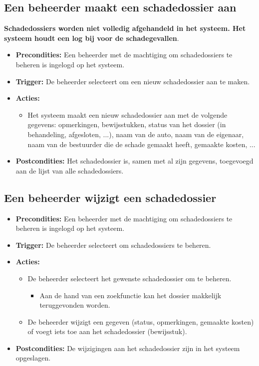 \documentclass[]{article}
\begin{document}
\subsection{Een beheerder maakt een schadedossier aan} \label{schade}
\textbf{Schadedossiers worden niet volledig afgehandeld in het systeem. Het systeem houdt een log bij voor de schadegevallen}.
\begin{itemize}
\item \textbf{Precondities:} Een beheerder met de machtiging om schadedossiers te beheren is ingelogd op het systeem. 
\item \textbf{Trigger:} De beheerder selecteert om een nieuw schadedossier aan te maken.
\item \textbf{Acties:} 
\begin{itemize}
	\item	Het systeem maakt een nieuw schadedossier aan met de volgende gegevens: opmerkingen, bewijsstukken, status van het dossier (in behandeling, afgesloten, ...), naam van de auto, naam van de eigenaar, naam van de bestuurder die de schade gemaakt heeft, gemaakte kosten, ...
\end{itemize}
\item \textbf{Postcondities:} Het schadedossier is, samen met al zijn gegevens, toegevoegd aan de lijst van alle schadedossiers.
\end{itemize}

\subsection{Een beheerder wijzigt een schadedossier}
\begin{itemize}
\item \textbf{Precondities:} Een beheerder met de machtiging om schadedossiers te beheren is ingelogd op het systeem. 
\item \textbf{Trigger:} De beheerder selecteert om schadedossiers te beheren.
\item \textbf{Acties:} 
\begin{itemize}
	\item	De beheerder selecteert het gewenste schadedossier om te beheren.
		\begin{itemize}
			\item	Aan de hand van een zoekfunctie kan het dossier makkelijk teruggevonden worden.
		\end{itemize}
	\item	De beheerder wijzigt een gegeven (status, opmerkingen, gemaakte kosten) of voegt iets toe aan het schadedossier (bewijsstuk).
\end{itemize}
\item \textbf{Postcondities:} De wijzigingen aan het schadedossier zijn in het systeem opgeslagen.
\end{itemize}
\end{document}
